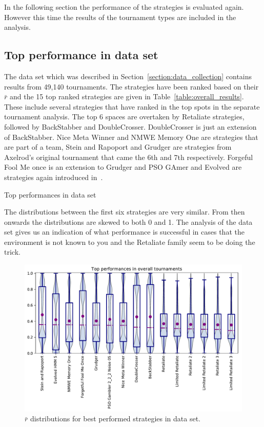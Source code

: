 \documentclass{article}
\begin{document}
In the following section the performance of the strategies is evaluated again.
However this time the results of the tournament types are included in the
analysis.

\subsection{Top performance in data set}\label{subsrction:overall}

The data set which was described in Section~\ref{section:data_collection}
contains results from 49,140 tournaments. The strategies have been ranked based
on their $\bar{r}$ and the 15 top ranked strategies are given in
Table~\ref{table:overall_results}. These include several strategies that have
ranked in the top spots in the separate tournament analysis. The top 6 spaces
are overtaken by Retaliate strategies, followed by BackStabber and
DoubleCrosser. DoubleCrosser is just an extension of BackStabber. Nice Meta
Winner and NMWE Memory One are strategies that are part of a team, Stein and
Rapoport and Grudger are strategies from Axelrod's original tournament that came
the 6th and 7th respectively. Forgeful Fool Me once is an extension to Grudger
and PSO GAmer and Evolved are strategies again introduced in~\cite{Harper2017}.

\begin{table}[!htbp]
    \centering
    \resizebox{.35\textwidth}{!}{
    }
    \caption{Top performances in data set}\label{table:overall_results}
\end{table}

The distributions between the first six strategies are very similar. From then
onwards the distributions are skewed to both 0 and 1. The analysis
of the data set gives us an indication of what performance is successful
in cases that the environment is not known to you and the Retaliate family
seem to be doing the trick.

\begin{figure}[!htbp]
    \centering
    \includegraphics[width=.8\textwidth]{../images/performance_merged.pdf}
    \caption{\(\bar{r}\) distributions for best performed strategies in data set.}
    \label{fig:overall_results}
\end{figure}
\end{document}
